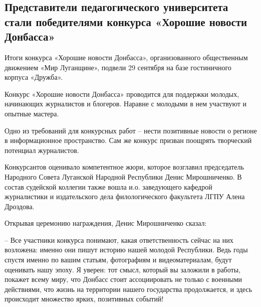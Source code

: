  
 
 
 
 
\subsection{Представители педагогического университета стали победителями конкурса «Хорошие новости Донбасса»}
\label{sec:29_09_2021.stz.edu.lnr.lgpu.1.konkurs_novosti_donbassa}


Итоги конкурса «Хорошие новости Донбасса», организованного общественным
движением «Мир Луганщине», подвели 29 сентября на базе гостиничного корпуса
«Дружба». 


Конкурс  «Хорошие новости Донбасса» проводится для поддержки молодых,
начинающих журналистов и блогеров. Наравне с молодыми в нем участвуют и опытные
мастера.

Одно из требований для конкурсных работ –  нести позитивные новости о регионе в
информационное пространство. Сам же конкурс призван поощрять творческий
потенциал журналистов.

Конкурсантов оценивало компетентное жюри, которое возглавил председатель
Народного Совета Луганской Народной Республики Денис Мирошниченко. В состав
судейской коллегии также вошла и.о. заведующего кафедрой журналистики и
издательского дела филологического факультета ЛГПУ Алена Дроздова.

Открывая церемонию награждения, Денис Мирошниченко сказал:

\begin{zznagolos}
– Все участники конкурса понимают, какая ответственность сейчас на них
возложена: именно они пишут историю нашей молодой Республики. Ведь годы спустя
именно по вашим статьям, фотографиям и видеоматериалам, будут оценивать нашу
эпоху. Я уверен: тот смысл, который вы заложили в работы, покажет всему миру,
что Донбасс стоит ассоциировать не только с военными действиями, что жизнь на
территории нашего государства продолжается, и здесь происходит множество ярких,
позитивных событий! 	
\end{zznagolos}

